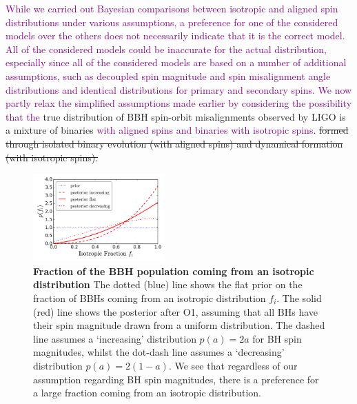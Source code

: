 \documentclass[modern,linenumbers]{aastex61}
\newcommand{\ilya}[1]{\textcolor{purple}{#1}}
\begin{document}
\ilya{While we carried out Bayesian comparisons between isotropic and aligned spin distributions under various assumptions, a preference for one of the considered models over the others does not necessarily indicate that it is the correct model.  All of the considered models could be inaccurate for the actual distribution, especially since all of the considered models are based on a number of additional assumptions, such as decoupled spin magnitude and spin misalignment angle distributions and identical distributions for primary and secondary spins.}
\ilya{We now partly relax the simplified assumptions made earlier by considering the possibility that the} true distribution of BBH spin-orbit misalignments observed by LIGO is a mixture of binaries \ilya{with aligned spins and binaries with isotropic spins}. 
\sout{formed through isolated binary evolution (with aligned spins) and dynamical formation (with isotropic spins).}

%
\begin{figure}
\centering
\includegraphics[width=0.45\textwidth]{../plots/posterior_on_isotropic_fraction.png}
\caption{\textbf{Fraction of the BBH population coming from an isotropic distribution} The dotted (blue) line shows the flat prior on the fraction of BBHs coming from an isotropic distribution $f_i$. The solid (red) line shows the posterior after O1, assuming that all BHs have their spin magnitude drawn from a uniform distribution. The dashed line assumes a `increasing' distribution $p(a) = 2a$ for BH spin magnitudes, whilst the dot-dash line assumes a `decreasing' distribution $p(a) = 2(1-a)$. We see that regardless of our assumption regarding BH spin magnitudes, there is a preference for a large fraction coming from an isotropic distribution.}
\label{fig:mixture_fraction_posterior}
\end{figure}
%

%
\end{document}
